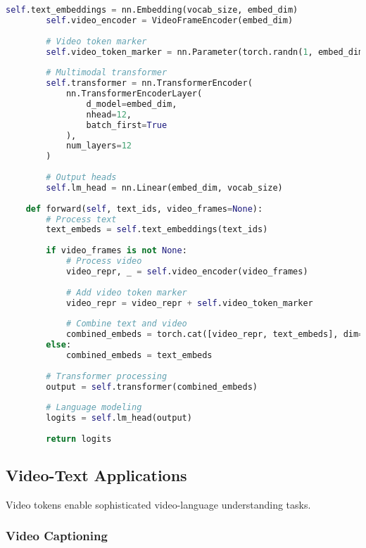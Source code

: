 \begin{lstlisting}[language=Python, caption=Video frame token architecture]
        self.text_embeddings = nn.Embedding(vocab_size, embed_dim)
        self.video_encoder = VideoFrameEncoder(embed_dim)
        
        # Video token marker
        self.video_token_marker = nn.Parameter(torch.randn(1, embed_dim))
        
        # Multimodal transformer
        self.transformer = nn.TransformerEncoder(
            nn.TransformerEncoderLayer(
                d_model=embed_dim,
                nhead=12,
                batch_first=True
            ),
            num_layers=12
        )
        
        # Output heads
        self.lm_head = nn.Linear(embed_dim, vocab_size)
    
    def forward(self, text_ids, video_frames=None):
        # Process text
        text_embeds = self.text_embeddings(text_ids)
        
        if video_frames is not None:
            # Process video
            video_repr, _ = self.video_encoder(video_frames)
            
            # Add video token marker
            video_repr = video_repr + self.video_token_marker
            
            # Combine text and video
            combined_embeds = torch.cat([video_repr, text_embeds], dim=1)
        else:
            combined_embeds = text_embeds
        
        # Transformer processing
        output = self.transformer(combined_embeds)
        
        # Language modeling
        logits = self.lm_head(output)
        
        return logits
\end{lstlisting}

\subsection{Video-Text Applications}

Video tokens enable sophisticated video-language understanding tasks.

\subsubsection{Video Captioning}

